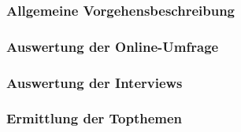 \documentclass[../../main.tex]{subfiles}
\begin{document}
\subsubsection{Allgemeine Vorgehensbeschreibung}\mbox{}





\subsubsection{Auswertung der Online-Umfrage}\mbox{}





\subsubsection{Auswertung der Interviews}\mbox{}





\subsubsection{Ermittlung der Topthemen}\mbox{}


\end{document}
